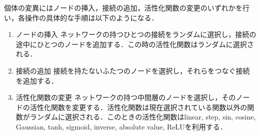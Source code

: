 個体の変異にはノードの挿入，接続の追加，活性化関数の変更のいずれかを行い，各操作の具体的な手順は以下のようになる．

\begin{enumerate}
    \item ノードの挿入
    ネットワークの持つひとつの接続をランダムに選択し，接続の途中にひとつのノードを追加する．この時の活性化関数はランダムに選択される．

    \item 接続の追加
    接続を持たないふたつのノードを選択し，それらをつなぐ接続を追加する．

    \item 活性化関数の変更
    ネットワークの持つ中間層のノードを選択し，そのノードの活性化関数を変更する．活性化関数は現在選択されている関数以外の関数がランダムに選択される．このときの活性化関数はlinear, step, sin, cosine, Gaussian, tanh, sigmoid, inverse, absolute value, ReLUを利用する．
\end{enumerate}